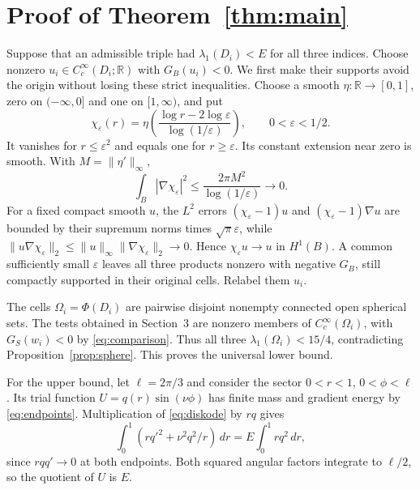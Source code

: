 \documentclass[11pt]{article}
\newcommand{\R}{\mathbb R}
\newcommand{\dd}{\,d}
\begin{document}
\section{Proof of Theorem~\ref{thm:main}}
Suppose that an admissible triple had $\lambda_1(D_i)<E$ for all three
indices. Choose nonzero $u_i\in C_c^\infty(D_i;\R)$ with $G_B(u_i)<0$.
We first make their supports avoid the origin without losing these strict
inequalities.
Choose a smooth $\eta:\R\to[0,1]$, zero on $(-\infty,0]$ and one on
$[1,\infty)$, and put
\[
 \chi_\varepsilon(r)=\eta\left(
 \frac{\log r-2\log\varepsilon}{\log(1/\varepsilon)}\right),
 \qquad 0<\varepsilon<1/2.
\]
It vanishes for $r\le\varepsilon^2$ and equals one for $r\ge\varepsilon$.
Its constant extension near zero is smooth. With $M=\|\eta'\|_\infty$,
\[
 \int_B|\nabla\chi_\varepsilon|^2
       \le\frac{2\pi M^2}{\log(1/\varepsilon)}\longrightarrow0.
\]
For a fixed compact smooth $u$, the $L^2$ errors
$(\chi_\varepsilon-1)u$ and
$(\chi_\varepsilon-1)\nabla u$ are bounded by their supremum norms times
$\sqrt\pi\varepsilon$, while
$\|u\nabla\chi_\varepsilon\|_2\le\|u\|_\infty
\|\nabla\chi_\varepsilon\|_2\to0$.
Hence $\chi_\varepsilon u\to u$ in $H^1(B)$.
A common sufficiently small $\varepsilon$ leaves all three products
nonzero with negative $G_B$, still compactly supported in their original
cells. Relabel them $u_i$.

The cells $\Omega_i=\Phi(D_i)$ are pairwise disjoint nonempty connected
open spherical sets. The tests obtained in Section~3 are nonzero members of
$C_c^\infty(\Omega_i)$, with $G_S(w_i)<0$ by \eqref{eq:comparison}.
Thus all three $\lambda_1(\Omega_i)<15/4$, contradicting
Proposition~\ref{prop:sphere}. This proves the universal lower bound.

For the upper bound, let $\ell=2\pi/3$ and consider the sector
$0<r<1$, $0<\phi<\ell$. Its trial function
$U=q(r)\sin(\nu\phi)$ has finite mass and gradient energy by
\eqref{eq:endpoints}. Multiplication of \eqref{eq:diskode} by $rq$ gives
\[
 \int_0^1\left(rq'^2+\nu^2q^2/r\right)\dd r
        =E\int_0^1rq^2\dd r,
\]
since $rqq'\to0$ at both endpoints. Both squared angular factors integrate
to $\ell/2$, so the quotient of $U$ is $E$.
\end{document}
